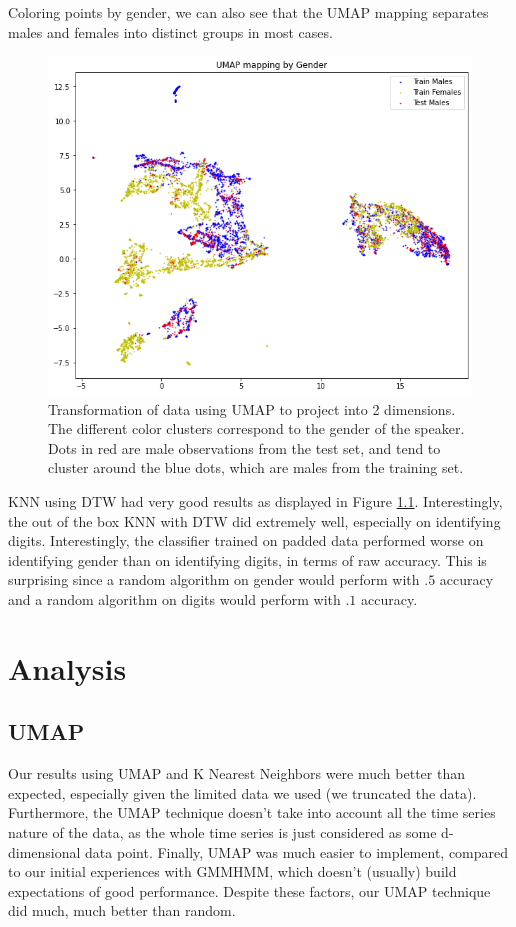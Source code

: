 \documentclass[11pt]{article}
\newcommand{\0}{{\vec  0 }}
\newcommand{\1}{{\mathbbm{  1} }}
\begin{document}
    
    Coloring points by gender, we can also see that the UMAP mapping separates males and females into distinct groups in most cases. 
   
    \begin{figure}
        \centering
        \includegraphics[width=0.7\linewidth]{UMAPGenderCompare}
        \caption{Transformation of data using UMAP to project into 2 dimensions. The different color clusters correspond to the gender of the speaker. Dots in red are male observations from the test set, and tend to cluster around the blue dots, which are males from the training set.}
        \label{fig:umapgendercompare}
    \end{figure}

    KNN using DTW had very good results as displayed in Figure %
    \ref{}. Interestingly, the out of the box KNN with DTW did extremely well, especially on identifying digits. Interestingly, the classifier trained on padded data performed worse on identifying gender than on identifying digits, in terms of raw accuracy. This is surprising since a random algorithm on gender would perform with $.5$ accuracy and a random algorithm on digits would perform with $.1$ accuracy. 
    
    \section{Analysis}
    
    \subsection{UMAP}
    Our results using UMAP and K Nearest Neighbors were much better than expected, especially given the limited data we used (we truncated the data). Furthermore, the UMAP technique doesn’t take into account all the time series nature of the data, as the whole time series is just considered as some d-dimensional data point. Finally, UMAP was much easier to implement, compared to our initial experiences with GMMHMM, which doesn’t (usually) build expectations of good performance. Despite these factors, our UMAP technique did much, much better than random. 
    
\end{document}

